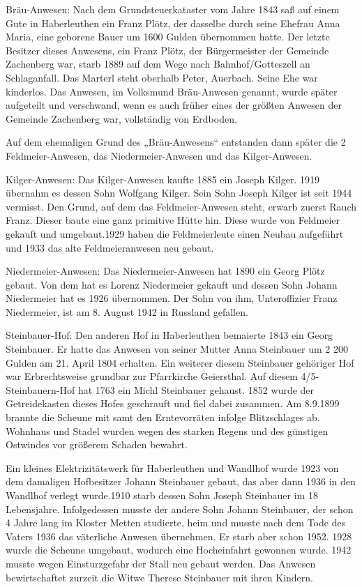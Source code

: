 \documentclass{book}
\begin{document}
Bräu-Anwesen: Nach dem Grundsteuerkataster vom Jahre 1843 saß auf einem Gute in
Haberleuthen ein Franz Plötz, der dasselbe durch seine Ehefrau Anna Maria, eine
geborene Bauer um 1600 Gulden übernommen hatte. Der letzte Besitzer dieses
Anwesens, ein Franz Plötz, der Bürgermeister der Gemeinde Zachenberg war, starb
1889 auf dem Wege nach Bahnhof/Gotteszell an Schlaganfall. Das Marterl steht
oberhalb Peter, Auerbach. Seine Ehe war kinderlos. Das Anwesen, im Volksmund
Bräu-Anwesen genannt, wurde später aufgeteilt und verschwand, wenn es auch
früher eines der größten Anwesen der Gemeinde Zachenberg war, vollständig von
Erdboden.

Auf dem ehemaligen Grund des „Bräu-Anwesens“ entstanden dann später die 2
Feldmeier-Anwesen, das Niedermeier-Anwesen und das Kilger-Anwesen.

Kilger-Anwesen: Das Kilger-Anwesen kaufte 1885 ein Joseph Kilger. 1919 übernahm
es dessen Sohn Wolfgang Kilger. Sein Sohn Joseph Kilger ist seit 1944 vermisst.
Den Grund, auf dem das Feldmeier-Anwesen steht, erwarb zuerst Rauch Franz.
Dieser baute eine ganz primitive Hütte hin. Diese wurde von Feldmeier gekauft
und umgebaut.1929 haben die Feldmeierleute einen Neubau aufgeführt und 1933 das
alte Feldmeieranwesen neu gebaut.

Niedermeier-Anwesen: Das Niedermeier-Anwesen hat 1890 ein Georg Plötz gebaut.
Von dem hat es Lorenz Niedermeier gekauft und dessen Sohn Johann Niedermeier hat
es 1926 übernommen. Der Sohn von ihm, Unteroffizier Franz Niedermeier, ist am 8.
August 1942 in Russland gefallen.

Steinbauer-Hof: Den anderen Hof in Haberleuthen bemaierte 1843 ein Georg
Steinbauer. Er hatte das Anwesen von seiner Mutter Anna Steinbauer um 2 200
Gulden am 21. April 1804 erhalten. Ein weiterer diesem Steinbauer gehöriger Hof
war Erbrechtsweise grundbar zur Pfarrkirche Geiersthal. Auf diesem
4/5-Steinbauern-Hof hat 1763 ein Michl Steinbauer gehaust. 1852 wurde der
Getreidekasten dieses Hofes geschrauft und fiel dabei zusammen. Am 8.9.1899
brannte die Scheune mit samt den Erntevorräten infolge Blitzschlages ab.
Wohnhaus und Stadel wurden wegen des starken Regens und des günstigen Ostwindes
vor größerem Schaden bewahrt.

Ein kleines Elektrizitätswerk für Haberleuthen und Wandlhof wurde 1923 von dem
damaligen Hofbesitzer Johann Steinbauer gebaut, das aber dann 1936 in den
Wandlhof verlegt wurde.1910 starb dessen Sohn Joseph Steinbauer im 18
Lebensjahre. Infolgedessen musste der andere Sohn Johann Steinbauer, der schon 4
Jahre lang im Kloster Metten studierte, heim und musste nach dem Tode des Vaters
1936 das väterliche Anwesen übernehmen. Er starb aber schon 1952. 1928 wurde die
Scheune umgebaut, wodurch eine Hocheinfahrt gewonnen wurde. 1942 musste wegen
Einsturzgefahr der Stall neu gebaut werden. Das Anwesen bewirtschaftet zurzeit
die Witwe Therese Steinbauer mit ihren Kindern.
\end{document}
